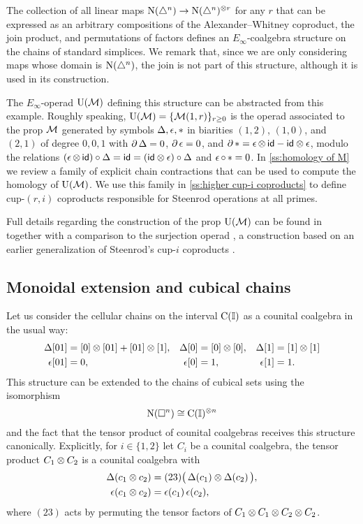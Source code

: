 The collection of all linear maps $\operatorname{N}(\triangle^n) \to \operatorname{N}(\triangle^n)^{\otimes r}$ for any $r$ that can be expressed as an arbitrary compositions of the Alexander--Whitney coproduct, the join product, and permutations of factors defines an $E_\infty$-coalgebra structure on the chains of standard simplices.
We remark that, since we are only considering maps whose domain is $\operatorname{N}(\triangle^n)$, the join is not part of this structure, although it is used in its construction.

The $E_\infty$-operad $\operatorname{\mathrm{U}(\mathcal{M})}$ defining this structure can be abstracted from this example.
Roughly speaking, $\operatorname{\mathrm{U}(\mathcal{M})} = \{\operatorname{\mathcal{M}}(1,r)\}_{r \geq 0}$ is the operad associated to the prop $\operatorname{\mathcal{M}}$ generated by symbols $\operatorname{\Delta}, \operatorname{\epsilon}, \operatorname{\ast}$ in biarities $(1,2)$, $(1,0)$, and $(2,1)$ of degree $0,0,1$ with $\operatorname{\partial} \operatorname{\Delta} = 0$, $\operatorname{\partial} \operatorname{\epsilon} = 0$, and $\operatorname{\partial} \operatorname{\ast} = \operatorname{\epsilon} \otimes \, \mathsf{id} - \mathsf{id} \otimes \operatorname{\epsilon}$, modulo the relations $(\operatorname{\epsilon} \otimes \, \mathsf{id}) \circ \operatorname{\Delta} = \mathsf{id} = (\mathsf{id} \otimes \operatorname{\epsilon}) \circ \operatorname{\Delta}$ and $\operatorname{\epsilon} \circ \, \ast = 0$.
In \cref{ss:homology of M} we review a family of explicit chain contractions that can be used to compute the homology of $\operatorname{\mathrm{U}(\mathcal{M})}$.
We use this family in \cref{ss:higher cup-i coproducts} to define cup-$(r,i)$ coproducts responsible for Steenrod operations at all primes.

Full details regarding the construction of the prop $\operatorname{\mathrm{U}(\mathcal{M})}$ can be found in \cite{medina2020prop1, medina2021prop2} together with a comparison to the surjection operad \cite{mcclure2003multivariable, berger2004combinatorial}, a construction based on an earlier generalization of Steenrod's cup-$i$ coproducts \cite[\S4.5]{benson1998representations}.

\subsection{Monoidal extension and cubical chains}

Let us consider the cellular chains on the interval $\operatorname{C}(\mathbb{I})$ as a counital coalgebra in the usual way:
\begin{align*}
\operatorname{\Delta}[01] &= [0] \otimes [01] + [01] \otimes [1], &
\operatorname{\Delta}[0]  &= [0] \otimes [0], &
\operatorname{\Delta}[1]  &= [1] \otimes [1] \\
\operatorname{\epsilon}[01] &= 0, &
\operatorname{\epsilon}[0]  &= 1, &
\operatorname{\epsilon} [1]  &= 1.
\end{align*}
This structure can be extended to the chains of cubical sets using the isomorphism
\[
\operatorname{N}(\square^n) \cong \operatorname{C}(\mathbb{I})^{\otimes n}
\]
and the fact that the tensor product of counital coalgebras receives this structure canonically.
Explicitly, for $i \in \{1,2\}$ let $C_i$ be a counital coalgebra, the tensor product $C_1 \otimes C_2$ is a counital coalgebra with
\begin{align} \label{e:extension of coproduct}
\operatorname{\Delta}(c_1 \otimes c_2) &= (23) \big( \operatorname{\Delta}(c_1) \otimes \operatorname{\Delta}(c_2) \, \big), \\
\label{e:extension of augmentation}
\operatorname{\epsilon}(c_1 \otimes c_2) &= \operatorname{\epsilon}(c_1) \operatorname{\epsilon}(c_2),
\end{align}
where $(23)$ acts by permuting the tensor factors of $C_1 \otimes C_1 \otimes C_2 \otimes C_2$.

